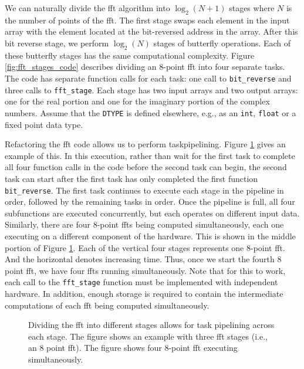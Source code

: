 We can naturally divide the \gls{fft} algorithm into $\log_2(N+1)$ stages where $N$ is the number of points of the \gls{fft}.  The first stage swaps each element in the input array with the element located at the bit-reversed address in the array. After this bit reverse stage, we perform $\log_2(N)$ stages of butterfly operations. Each of these butterfly stages has the same computational complexity.  Figure \ref{fig:fft_stages_code} describes dividing an 8-point \gls{fft} into four separate tasks. The code has separate function calls for each task: one call to \lstinline{bit_reverse} and three calls to \lstinline{fft_stage}. Each stage has two input arrays and two output arrays: one for the real portion and one for the imaginary portion of the complex numbers. Assume that the \lstinline{DTYPE} is defined elsewhere, e.g., as an \lstinline{int}, \lstinline{float} or a fixed point data type.

Refactoring the \gls{fft} code allows us to perform \gls{taskpipelining}. Figure \ref{fig:fftstages} gives an example of this. In this execution, rather than wait for the first task to complete all four function calls in the code before the second task can begin, the second task can start after the first task has only completed the first function \lstinline{bit_reverse}. The first task continues to execute each stage in the pipeline in order, followed by the remaining tasks in order.  Once the pipeline is full, all four subfunctions are executed concurrently, but each operates on different input data. Similarly, there are four 8-point \glspl{fft} being computed simultaneously, each one executing on a different component of the hardware. This is shown in the middle portion of Figure \ref{fig:fftstages}. Each of the vertical four stages represents one 8-point \gls{fft}. And the horizontal denotes increasing time. Thus, once we start the fourth 8 point \gls{fft}, we have four \glspl{fft} running simultaneously.  Note that for this to work, each call to the \lstinline{fft_stage} function must be implemented with independent hardware.  In addition, enough storage is required to contain the intermediate computations of each \gls{fft} being computed simultaneously.

\begin{figure}
\centering
{\scriptsize }

\caption{ Dividing the \gls{fft} into different stages allows for task pipelining across each stage. The figure shows an example with three \gls{fft} stages (i.e., an 8 point \gls{fft}). The figure shows four 8-point \gls{fft} executing simultaneously. }
\label{fig:fftstages}
\end{figure}

